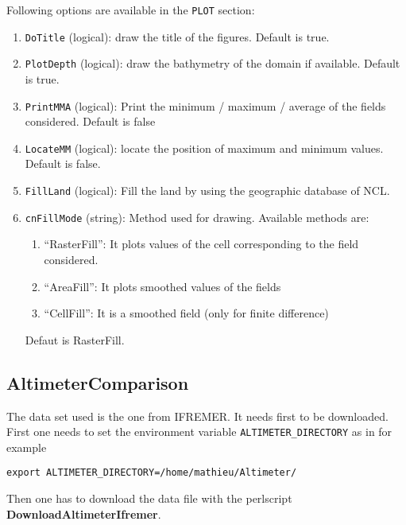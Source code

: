 \documentclass[12pt]{amsart}
\begin{document}
Following options are available in the {\tt PLOT} section:
\begin{enumerate}
\item {\tt DoTitle} (logical): draw the title of the figures. Default is true.
\item {\tt PlotDepth} (logical): draw the bathymetry of the domain if available. Default is true.
\item {\tt PrintMMA} (logical): Print the minimum / maximum / average of the fields considered. Default is false
\item {\tt LocateMM} (logical): locate the position of maximum and minimum values. Default is false.
\item {\tt FillLand} (logical): Fill the land by using the geographic database of NCL.
\item {\tt cnFillMode} (string): Method used for drawing. Available methods are:
  \begin{enumerate}
  \item ``RasterFill'': It plots values of the cell corresponding to the field considered.
  \item ``AreaFill'': It plots smoothed values of the fields
  \item ``CellFill'': It is a smoothed field (only for finite difference)
  \end{enumerate}
  Defaut is RasterFill.
\end{enumerate}





\subsection{AltimeterComparison}

The data set used is the one from IFREMER. It needs first to be downloaded.
First one needs to set the environment variable {\tt ALTIMETER\_DIRECTORY}
as in for example
\begin{verbatim}
export ALTIMETER_DIRECTORY=/home/mathieu/Altimeter/
\end{verbatim}
Then one has to download the data file with the perlscript {\bf DownloadAltimeterIfremer}.
\end{document}
